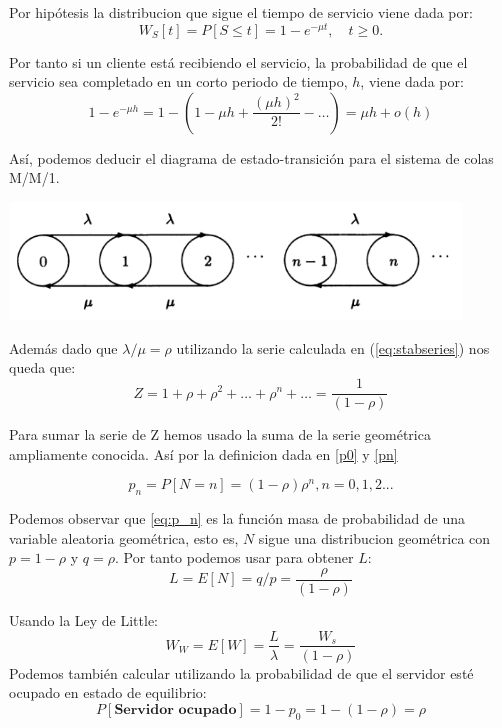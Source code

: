 \documentclass[8pt]{beamer}
\begin{document}
\begin{frame}
	Por hipótesis la distribucion que sigue el tiempo de servicio viene dada por:
	\begin{equation*}
	W_S[t] = P[S\leq t] = 1-e^{-\mu t}, \quad t\ge 0.
	\end{equation*}
	
	Por tanto si un cliente está recibiendo el servicio, la probabilidad de que el servicio sea completado en un corto periodo de tiempo, $h$, viene dada por:
	\begin{equation*}
	1-e^{-\mu h} = 1 - \left(1-\mu h+\frac{(\mu h)^2}{2!}- \dots\right)=\mu h +o(h)
	\end{equation*}
\end{frame}
\begin{frame}
	Así, podemos deducir el diagrama de estado-transición para el sistema de colas M/M/1. 
	
	\begin{center}
	  \includegraphics[width=0.9\textwidth]{./imgs/diagrama.png}
	\end{center}
	
	Además dado que $\lambda/\mu=\rho$ utilizando la serie calculada en (\ref{eq:stabseries}) nos queda que:
	\begin{equation*}
	Z=1+\rho+\rho^2+\dots+\rho^n+\dots=\frac{1}{(1-\rho)}
	\end{equation*}
\end{frame}
\begin{frame}
	Para sumar la serie de Z hemos usado la suma de la serie geométrica ampliamente conocida.
	Así por la definicion dada en \eqref{p0} y \eqref{pn}
	
	\begin{equation}
	p_n=P[N=n]=(1-\rho)\rho^n, n=0,1,2...
	\label{eq:p_n}
	\end{equation}
\end{frame}
\begin{frame}
	Podemos observar que \eqref{eq:p_n} es la función masa de probabilidad de una variable aleatoria geométrica, esto
	es, $N$ sigue una distribucion geométrica con $p = 1-\rho$ y $q = \rho$. Por tanto podemos usar para obtener $L$:
	\begin{equation*}
	L=E[N]=q/p=\frac{\rho}{(1-\rho)}
	\end{equation*}
	
	Usando la Ley de Little:
	\begin{equation*}
	W_W=E[W]=\frac{L}{\lambda}=\frac{W_s}{(1-\rho)}
	\end{equation*}
	Podemos también calcular utilizando la probabilidad de que el servidor esté ocupado en estado de equilibrio:
	\begin{equation*}
	P[\textbf{Servidor ocupado}]=1-p_0=1-(1-\rho)=\rho
	\end{equation*}
\end{frame}
\end{document}
